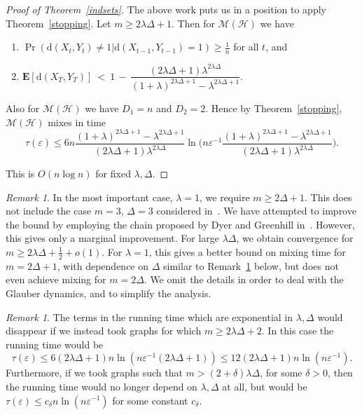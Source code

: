 \documentclass[11pt]{article}
\theoremstyle{definition}
\theoremstyle{remark}
\newtheorem{rem}[thm]{Remark}
\newcommand{\eps}{\varepsilon}
\newcommand{\e}{\mathbf{E}}
\newcommand{\M}{\mathcal{M}}
\newcommand{\CH}{\mathcal{H}}
\begin{document}
\begin{proof}[Proof of Theorem~\ref{indsets}]
The above work puts us in a position to apply
Theorem~\ref{stopping}. Let $m\geq 2\lambda\Delta+1$. Then for
$\M(\CH)$ we have
\begin{enumerate}
\item $\Pr(\mathrm{d}(X_t,Y_t)\neq1| \mathrm{d}(X_{t-1},Y_{t-1})=1)\geq
\frac{1}{n}$ for all $t$, and \item $\e[\mathrm{d}(X_T,Y_T)]\ <\ 1\, -\,
\dfrac{(2\lambda\Delta+1)\lambda^{2\lambda\Delta}}
{(1+\lambda)^{2\lambda\Delta+1}-\lambda^{2\lambda\Delta+1}}.$
\end{enumerate}
Also for $\M(\CH)$ we have $D_1=n$ and $D_2=2$. Hence by
Theorem~\ref{stopping}, $\M(\CH)$ mixes in time
 \[\tau(\eps)\leq
6n \frac{(1+\lambda)^{2\lambda\Delta+1}-\lambda^{2\lambda\Delta+1}}
{(2\lambda\Delta+1)\lambda^{2\lambda\Delta}}\ln\Big(n\eps^{-1}\frac{(1+\lambda)^{2\lambda\Delta+1}-\lambda^{2\lambda\Delta+1}}
{(2\lambda\Delta+1)\lambda^{2\lambda\Delta}}\Big).\]

This is $O(n\log n)$ for fixed $\lambda,\Delta$.
\end{proof}
\begin{rem}
In the most important case, $\lambda=1$, we require $m\geq
2\Delta+1$. This does not include the case $m=3$, $\Delta=3$
considered in~\cite{DG00a}. We have attempted to improve the bound by employing the chain proposed by
Dyer and Greenhill in~\cite[Section~4]{DG00a}. However, this gives only a
marginal improvement. For large $\lambda\Delta$, we obtain convergence for
$m \geq 2\lambda\Delta+\tfrac{1}{2}+o(1)$. For $\lambda=1$, this gives a
better bound on mixing time for $m=2\Delta+1$, with dependence on $\Delta$
similar to Remark~\ref{rem05} below, but does not even achieve mixing for
$m=2\Delta$.
We omit the details in
order to deal with the Glauber dynamics, and to simplify the
analysis.
\end{rem}
\begin{rem}\label{rem05}
The terms in the running time which are exponential in
$\lambda,\Delta$ would disappear if we instead took graphs for which
$m\geq 2\lambda\Delta+2$. In this case the running time would be
\[\tau(\eps)\leq
 6(2\lambda\Delta+1) n \ln(n\eps^{-1}(2\lambda\Delta+1))\leq  12(2\lambda\Delta+1) n \ln(n\eps^{-1}).\]
Furthermore, if we took graphs such that
$m>(2+\delta)\lambda\Delta$, for some $\delta>0$, then the running
time would no longer depend on $\lambda,\Delta$ at all, but would be
$\tau(\eps)\leq c_\delta n \ln (n\eps^{-1})$ for some constant
$c_\delta$.
\end{rem}
\end{document}
